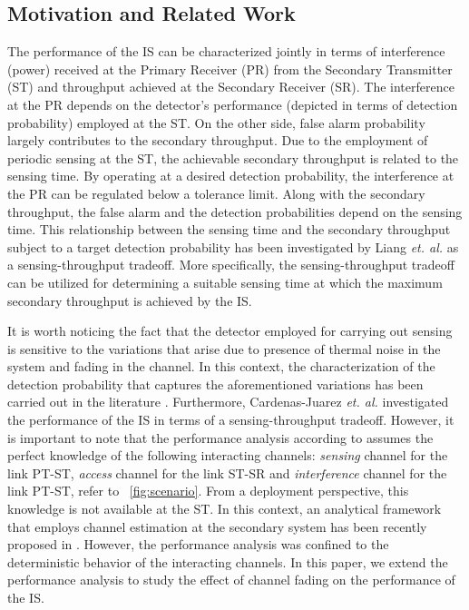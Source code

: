\subsection{Motivation and Related Work}
The performance of the IS can be characterized jointly in terms of interference (power) received at the Primary Receiver (PR) from the Secondary Transmitter (ST) and throughput achieved at the Secondary Receiver (SR). The interference at the PR depends on the detector's performance (depicted in terms of detection probability) employed at the ST. On the other side, false alarm probability largely contributes to the secondary throughput. Due to the employment of periodic sensing at the ST, the achievable secondary throughput is related to the sensing time. By operating at a desired detection probability, the interference at the PR can be regulated below a tolerance limit. Along with the secondary throughput, the false alarm and the detection probabilities depend on the sensing time. This relationship between the sensing time and the secondary throughput subject to a target detection probability has been investigated by Liang \textit{et. al.} \cite{Liang08} as a sensing-throughput tradeoff. More specifically, the sensing-throughput tradeoff can be utilized for determining a suitable sensing time at which the maximum secondary throughput is achieved by the IS. 

It is worth noticing the fact that the detector employed for carrying out sensing is sensitive to the variations that arise due to presence of thermal noise in the system and fading in the channel. In this context, the characterization of the detection probability that captures the aforementioned variations has been carried out in the literature \cite{Kostylev02, Alouini03, Herath09}. Furthermore, Cardenas-Juarez \textit{et. al.} \cite{Juarez11} investigated the performance of the IS in terms of a sensing-throughput tradeoff. However, it is important to note that the performance analysis according to \cite{Alouini03, Herath09, Juarez11} assumes the perfect knowledge of the following interacting channels: \textit{sensing} channel for the link PT-ST, \textit{access} channel for the link ST-SR and \textit{interference} channel for the link PT-ST, refer to \figurename~\ref{fig:scenario}. From a deployment perspective, this knowledge is not available at the ST. In this context, an analytical framework that employs channel estimation at the secondary system has been recently proposed in \cite{Kaushik16}. However, the performance analysis was confined to the deterministic behavior of the interacting channels. In this paper, we extend the performance analysis to study the effect of channel fading on the performance of the IS.  

